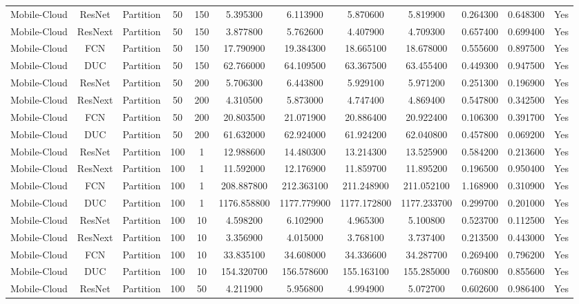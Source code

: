\begin{tabular}{|c||c||c||c||c||c||c||c||c||c||c||c|}
Mobile-Cloud & ResNet & Partition & 50 & 150 & 5.395300 & 6.113900 & 5.870600 & 5.819900 & 0.264300 & 0.648300 & Yes \\
Mobile-Cloud & ResNext & Partition & 50 & 150 & 3.877800 & 5.762600 & 4.407900 & 4.709300 & 0.657400 & 0.699400 & Yes \\
Mobile-Cloud & FCN & Partition & 50 & 150 & 17.790900 & 19.384300 & 18.665100 & 18.678000 & 0.555600 & 0.897500 & Yes \\
Mobile-Cloud & DUC & Partition & 50 & 150 & 62.766000 & 64.109500 & 63.367500 & 63.455400 & 0.449300 & 0.947500 & Yes \\
Mobile-Cloud & ResNet & Partition & 50 & 200 & 5.706300 & 6.443800 & 5.929100 & 5.971200 & 0.251300 & 0.196900 & Yes \\
Mobile-Cloud & ResNext & Partition & 50 & 200 & 4.310500 & 5.873000 & 4.747400 & 4.869400 & 0.547800 & 0.342500 & Yes \\
Mobile-Cloud & FCN & Partition & 50 & 200 & 20.803500 & 21.071900 & 20.886400 & 20.922400 & 0.106300 & 0.391700 & Yes \\
Mobile-Cloud & DUC & Partition & 50 & 200 & 61.632000 & 62.924000 & 61.924200 & 62.040800 & 0.457800 & 0.069200 & Yes \\
Mobile-Cloud & ResNet & Partition & 100 & 1 & 12.988600 & 14.480300 & 13.214300 & 13.525900 & 0.584200 & 0.213600 & Yes \\
Mobile-Cloud & ResNext & Partition & 100 & 1 & 11.592000 & 12.176900 & 11.859700 & 11.895200 & 0.196500 & 0.950400 & Yes \\
Mobile-Cloud & FCN & Partition & 100 & 1 & 208.887800 & 212.363100 & 211.248900 & 211.052100 & 1.168900 & 0.310900 & Yes \\
Mobile-Cloud & DUC & Partition & 100 & 1 & 1176.858800 & 1177.779900 & 1177.172800 & 1177.233700 & 0.299700 & 0.201000 & Yes \\
Mobile-Cloud & ResNet & Partition & 100 & 10 & 4.598200 & 6.102900 & 4.965300 & 5.100800 & 0.523700 & 0.112500 & Yes \\
Mobile-Cloud & ResNext & Partition & 100 & 10 & 3.356900 & 4.015000 & 3.768100 & 3.737400 & 0.213500 & 0.443000 & Yes \\
Mobile-Cloud & FCN & Partition & 100 & 10 & 33.835100 & 34.608000 & 34.336600 & 34.287700 & 0.269400 & 0.796200 & Yes \\
Mobile-Cloud & DUC & Partition & 100 & 10 & 154.320700 & 156.578600 & 155.163100 & 155.285000 & 0.760800 & 0.855600 & Yes \\
Mobile-Cloud & ResNet & Partition & 100 & 50 & 4.211900 & 5.956800 & 4.994900 & 5.072700 & 0.602600 & 0.986400 & Yes \\

\end{tabular}
